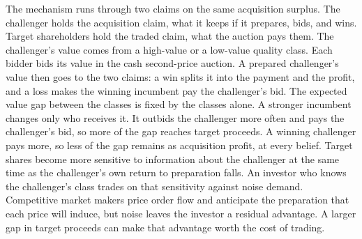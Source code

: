 The mechanism runs through two claims on the same acquisition surplus.
The challenger holds the acquisition claim, what it keeps if it
prepares, bids, and wins. Target shareholders hold the traded claim,
what the auction pays them. The challenger's value comes from a
high-value or a low-value quality class. Each bidder bids its value in
the cash second-price auction. A prepared challenger's value then goes
to the two claims: a win splits it into the payment and the profit, and
a loss makes the winning incumbent pay the challenger's bid. The
expected value gap between the classes is fixed by the classes alone.
A stronger incumbent changes only who receives it. It outbids the
challenger more often and pays the challenger's bid, so more of the gap
reaches target proceeds. A winning challenger pays more, so less of
the gap remains as acquisition profit, at every belief. Target shares become
more sensitive to information about the challenger at the same time as
the challenger's own return to preparation falls. An investor who knows
the challenger's class trades on that sensitivity against noise demand.
Competitive market makers price order flow and anticipate the
preparation that each price will induce, but noise leaves the investor a
residual advantage. A larger gap in target proceeds can make that
advantage worth the cost of trading.
